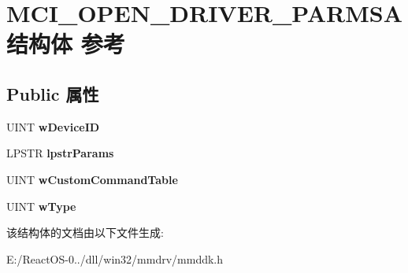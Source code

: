 \hypertarget{struct_m_c_i___o_p_e_n___d_r_i_v_e_r___p_a_r_m_s_a}{}\section{M\+C\+I\+\_\+\+O\+P\+E\+N\+\_\+\+D\+R\+I\+V\+E\+R\+\_\+\+P\+A\+R\+M\+S\+A结构体 参考}
\label{struct_m_c_i___o_p_e_n___d_r_i_v_e_r___p_a_r_m_s_a}
\subsection*{Public 属性}
\begin{DoxyCompactItemize}
\item 
\mbox{\label{struct_m_c_i___o_p_e_n___d_r_i_v_e_r___p_a_r_m_s_a_a09933d8dcd8cc4835cafb034a054a9f5}} 
U\+I\+NT {\bfseries w\+Device\+ID}
\item 
\mbox{\label{struct_m_c_i___o_p_e_n___d_r_i_v_e_r___p_a_r_m_s_a_a9c65a80b7ebba61110e51f08a93c0838}} 
L\+P\+S\+TR {\bfseries lpstr\+Params}
\item 
\mbox{\label{struct_m_c_i___o_p_e_n___d_r_i_v_e_r___p_a_r_m_s_a_aa5328fc421faf223961276e893a46934}} 
U\+I\+NT {\bfseries w\+Custom\+Command\+Table}
\item 
\mbox{\label{struct_m_c_i___o_p_e_n___d_r_i_v_e_r___p_a_r_m_s_a_aee421055165e6fd981e7960ed3544014}} 
U\+I\+NT {\bfseries w\+Type}
\end{DoxyCompactItemize}


该结构体的文档由以下文件生成\+:\begin{DoxyCompactItemize}
\item 
E\+:/\+React\+O\+S-\/0../dll/win32/mmdrv/mmddk.\+h\end{DoxyCompactItemize}
